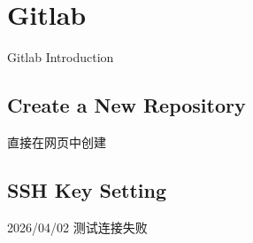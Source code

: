 \chapter{Gitlab}
Gitlab Introduction


\section{Create a New Repository}
直接在网页中创建

\section{SSH Key Setting}
2026/04/02 测试连接失败